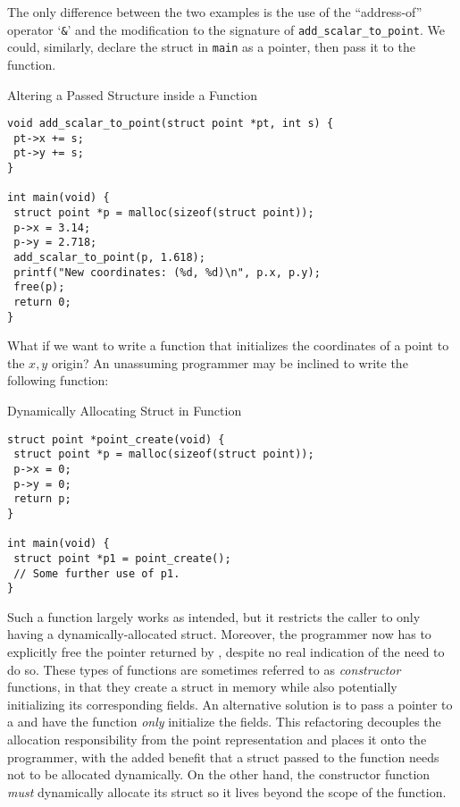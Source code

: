 The only difference between the two examples is the use of the ``address-of'' operator `\texttt{\&}' and the modification to the signature of \texttt{add_scalar_to_point}. We could, similarly, declare the struct in \texttt{main} as a pointer, then pass it to the function.

\begin{cl}[main.c]{Altering a Passed Structure inside a Function}\begin{lstlisting}[language=MyC]
void add_scalar_to_point(struct point *pt, int s) {
 pt->x += s;
 pt->y += s;
}

int main(void) {
 struct point *p = malloc(sizeof(struct point));
 p->x = 3.14;
 p->y = 2.718;
 add_scalar_to_point(p, 1.618);
 printf("New coordinates: (%d, %d)\n", p.x, p.y);
 free(p);
 return 0;
}
\end{lstlisting}\end{cl}

What if we want to write a function that initializes the coordinates of a point to the $x,y$ origin? An unassuming programmer may be inclined to write the following function:

\begin{cl}[main.c]{Dynamically Allocating Struct in Function}
\begin{lstlisting}[language=MyC]
struct point *point_create(void) {
 struct point *p = malloc(sizeof(struct point));
 p->x = 0;
 p->y = 0;
 return p;
}

int main(void) {
 struct point *p1 = point_create();
 // Some further use of p1.
}
\end{lstlisting}
\end{cl}

Such a  function largely works as intended, but it restricts the caller to only having a dynamically-allocated struct. Moreover, the programmer now has to explicitly free the pointer returned by , despite no real indication of the need to do so. These types of functions are sometimes referred to as \textit{constructor} functions, in that they create a struct in memory while also potentially initializing its corresponding fields. An alternative solution is to pass a pointer to a  and have the function \textit{only} initialize the fields. This refactoring decouples the allocation responsibility from the point representation and places it onto the programmer, with the added benefit that a struct passed to the function needs not to be allocated dynamically. On the other hand, the constructor function \textit{must} dynamically allocate its struct so it lives beyond the scope of the function.

